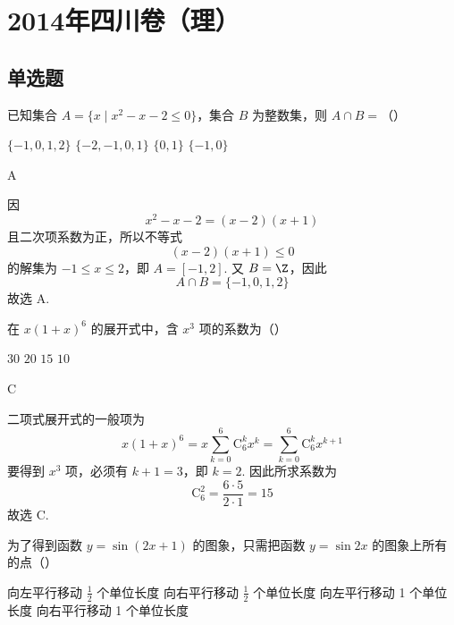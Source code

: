 \chapter{2014年四川卷（理）}

\section{单选题}

\begin{problem}
已知集合 \(A = \{x \mid x^2 - x - 2 \leqslant 0\}\)，集合 \(B\) 为整数集，则 \(A \cap B =\)（\quad）

\choices
    {\( \{-1,0,1,2\} \)}
    {\(\{-2, -1, 0, 1\}\)}
    {\(\{0, 1\}\)}
    {\(\{-1,0\}\)}
\end{problem}

\begin{answer}
A
\end{answer}

\begin{solution}
因
\[
x^2-x-2=(x-2)(x+1)
\]
且二次项系数为正，所以不等式
\[
(x-2)(x+1)\leqslant0
\]
的解集为 \(-1\leqslant x\leqslant2\)，即 \(A=[-1,2]\). 又 \(B=\Z\)，因此
\[
A\cap B=\{-1,0,1,2\}
\]
故选 A.
\end{solution}

\begin{problem}
在 \(x(1 + x)^6\) 的展开式中，含 \(x^3\) 项的系数为（\quad）

\choices
    {\(30\)}
    {\(20\)}
    {\(15\)}
    {\(10\)}
\end{problem}

\begin{answer}
C
\end{answer}

\begin{solution}
二项式展开式的一般项为
\[
x(1+x)^6=x\sum_{k=0}^{6}\mathrm C_6^k x^k
=\sum_{k=0}^{6}\mathrm C_6^k x^{k+1}
\]
要得到 \(x^3\) 项，必须有 \(k+1=3\)，即 \(k=2\). 因此所求系数为
\[
\mathrm C_6^2=\frac{6\cdot5}{2\cdot1}=15
\]
故选 C.
\end{solution}

\begin{problem}
为了得到函数 \( y = \sin (2x + 1) \) 的图象，只需把函数 \( y = \sin 2x \) 的图象上所有的点（\quad）

\choices
    {向左平行移动 \(\frac{1}{2}\) 个单位长度}
    {向右平行移动 \(\frac{1}{2}\) 个单位长度}
    {向左平行移动 1 个单位长度}
    {向右平行移动 1 个单位长度}
\end{problem}

